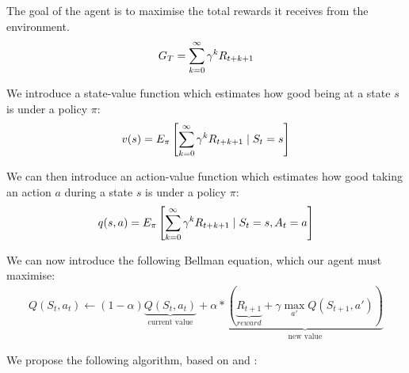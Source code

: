 \documentclass[12pt]{article}
\begin{document}
The goal of the agent is to maximise the total rewards it receives from the environment\cite{reinforcementlearningintro}.
\begin{align*}
  G_T = \sum_{\mathclap{k=0}}^{\infty} \gamma^{k} R_{t+k+1}
\end{align*}

We introduce a state-value function  which estimates how good being at a state $s$ is under a policy $\pi$:
\begin{align*}
  v(s) = E_{\pi}\left[\sum_{\mathclap{k=0}}^{\infty}\gamma^{k} R_{t+k+1} \mid S_t = s\right]
\end{align*}

We can then introduce an action-value function which estimates how good taking an action $a$ during a state $s$ is under a policy $\pi$:
\begin{align*}
  q(s, a) = E_{\pi}\left[\sum_{\mathclap{k=0}}^{\infty}\gamma^{k} R_{t+k+1} \mid S_t = s, A_t = a\right]
\end{align*}

We can now introduce the following Bellman equation, which our agent must maximise:
\begin{align*}
  Q(S_t, a_t) \gets (1 - \alpha) \underbrace{Q(S_t, a_t)}_{\text{current value}} + \alpha * \underbrace{(\underbrace{R_{t+1}}_{reward} + \gamma \max_{a'}{Q(S_{t+1}, a')})}_{\text{new value}}
\end{align*}

We propose the following algorithm, based on \cite[p.~67--72]{AICourse13} and \cite{qlearningalgo}:
\end{document}
